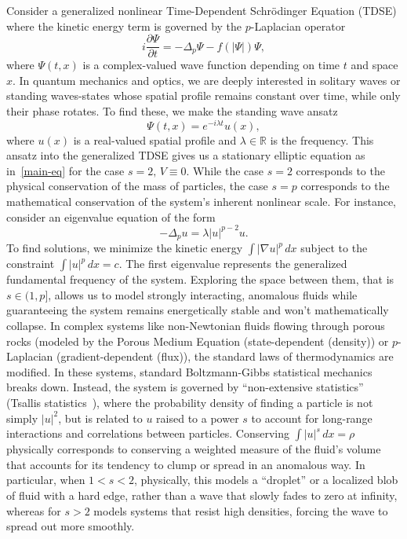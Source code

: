 \documentclass[11pt,reqno]{amsart}
\theoremstyle{definition}
\numberwithin{equation}{section}
\numberwithin{theorem}{section}
\numberwithin{equation}{section}
\numberwithin{theorem}{section}
\begin{document}
Consider a generalized nonlinear Time-Dependent Schrödinger Equation (TDSE) where the kinetic energy term is governed by the $p$-Laplacian operator
$$i \frac{\partial \Psi}{\partial t} = -\Delta_p \Psi - f(|\Psi|)\Psi,$$
where $\Psi(t, x)$ is a complex-valued wave function depending on time $t$ and space $x$. In quantum mechanics and optics, we are deeply interested in solitary waves or standing waves-states whose spatial profile remains constant over time, while only their phase rotates. To find these, we make the standing wave ansatz
$$\Psi(t, x) = e^{-i\lambda t} u(x),$$
where $u(x)$ is a real-valued spatial profile and $\lambda \in \mathbb{R}$ is the frequency. This ansatz into the generalized TDSE gives us a stationary elliptic equation as in~\eqref{main-eq} for the case $s=2,\, V\equiv 0$.
While the case $s=2$ corresponds to the physical conservation of the mass of particles, the case $s=p$ corresponds to the mathematical conservation of the system's inherent nonlinear scale. 
For instance, consider  an eigenvalue equation of the form
$$-\Delta_p u = \lambda |u|^{p-2}u.$$
To find solutions, we minimize the kinetic energy $\int |\nabla u|^p \, dx$ subject to the constraint $\int |u|^p \, dx = c$. The first eigenvalue represents the generalized fundamental frequency of the system.
Exploring the space between them, that is $s \in (1, p]$, allows us to model strongly interacting, anomalous fluids while guaranteeing the system remains energetically stable and won't mathematically collapse.
In complex systems like non-Newtonian fluids flowing through porous rocks (modeled by the Porous Medium Equation (state-dependent (density)) or $p$-Laplacian (gradient-dependent (flux)), the standard laws of thermodynamics are modified. In these systems, standard Boltzmann-Gibbs statistical mechanics breaks down. Instead, the system is governed by ``non-extensive statistics'' (Tsallis statistics~\cite{Tsallis1988, tsallis2009}), where the probability density of finding a particle is not simply $|u|^2$, but is related to $u$ raised to a power $s$ to account for long-range interactions and correlations between particles. Conserving $\int |u|^s \, dx = \rho$ physically corresponds to conserving a weighted measure of the fluid's volume that accounts for its tendency to clump or spread in an anomalous way. %
In particular, when $1<s<2$, physically, this models a ``droplet'' or a localized blob of fluid with a hard edge, rather than a wave that slowly fades to zero at infinity, whereas for $s>2$ models systems that resist high densities, forcing the wave to spread out more smoothly.
\end{document}
